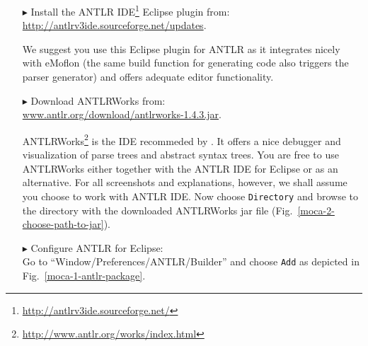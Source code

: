 \begin{enumerate}
\item[$\blacktriangleright$] Install the ANTLR IDE\footnote{\url{http://antlrv3ide.sourceforge.net/}} Eclipse plugin from:\\ \url{http://antlrv3ide.sourceforge.net/updates}.

We suggest you use this Eclipse plugin for ANTLR as it integrates nicely with eMoflon (the same build function for generating code also triggers the parser generator) and offers adequate editor functionality.

\item[$\blacktriangleright$] Download ANTLRWorks from:\\ \url{www.antlr.org/download/antlrworks-1.4.3.jar}.

ANTLRWorks\footnote{\url{http://www.antlr.org/works/index.html}} is the IDE recommeded by \cite{ANTLR}.  
It offers a nice debugger and visualization of parse trees and abstract syntax trees.
You are free to use ANTLRWorks either together with the ANTLR IDE for Eclipse or as an alternative.
For all screenshots and explanations, however, we shall assume you choose to work with ANTLR IDE.  
Now choose \texttt{Directory} and browse to the directory with the downloaded ANTLRWorks jar file (Fig.~\ref{moca-2-choose-path-to-jar}).

\item[$\blacktriangleright$] Configure ANTLR for Eclipse:\\ Go to ``Window/Preferences/ANTLR/Builder'' and choose \texttt{Add} as depicted in Fig.~\ref{moca-1-antlr-package}.


\end{enumerate}
